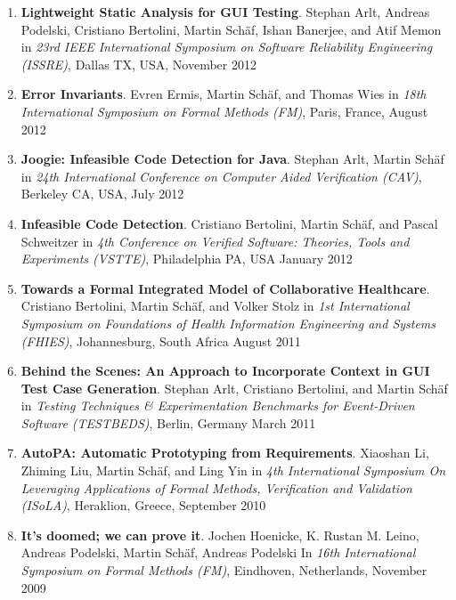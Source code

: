 \begin{enumerate}
  
\item \textbf{Lightweight Static Analysis for GUI Testing}. Stephan
Arlt, Andreas Podelski, Cristiano Bertolini, Martin Sch\"af, Ishan Banerjee, and
Atif Memon in \emph{ 23rd IEEE International Symposium on Software Reliability
Engineering (ISSRE)}, Dallas TX, USA, November 2012


\item \textbf{Error Invariants}. Evren Ermis, Martin Sch\"af, and Thomas Wies in
\emph{18th International Symposium on Formal Methods (FM)}, Paris, France,
August 2012

\item \textbf{Joogie: Infeasible Code Detection for Java}. Stephan Arlt, Martin
Sch\"af in \emph{24th International Conference on Computer Aided Verification
(CAV)}, Berkeley CA, USA, July 2012

\item \textbf{Infeasible Code Detection}. Cristiano Bertolini, Martin
Sch\"af, and Pascal Schweitzer in \emph{4th Conference on Verified Software:
Theories, Tools and Experiments (VSTTE)}, Philadelphia PA, USA January 2012

\item \textbf{Towards a Formal Integrated Model of Collaborative Healthcare}.
Cristiano Bertolini, Martin Sch\"af, and Volker Stolz  in \emph{1st International Symposium on 
Foundations of Health Information Engineering and Systems (FHIES)}, Johannesburg, South Africa
August 2011

\item \textbf{Behind the Scenes: An Approach to Incorporate Context in GUI Test
Case Generation}. Stephan Arlt, Cristiano Bertolini, and Martin Sch\"af  in \emph{Testing Techniques \& Experimentation Benchmarks
for Event-Driven Software (TESTBEDS)}, Berlin, Germany
March 2011

\item \textbf{AutoPA: Automatic Prototyping from Requirements}. Xiaoshan Li,
Zhiming Liu, Martin Sch\"af, and Ling Yin in \emph{4th International Symposium On Leveraging Applications of Formal Methods, Verification and Validation (ISoLA)}, Heraklion, Greece,
September 2010

\item \textbf{It's doomed; we can prove it}. Jochen Hoenicke, K. Rustan M.
Leino, Andreas Podelski, Martin Sch\"af, Andreas Podelski In
\emph{16th International Symposium on Formal Methods (FM)}, Eindhoven, Netherlands,
November 2009
  
\setcounter{saveenum}{\value{enumi}}
\end{enumerate}



